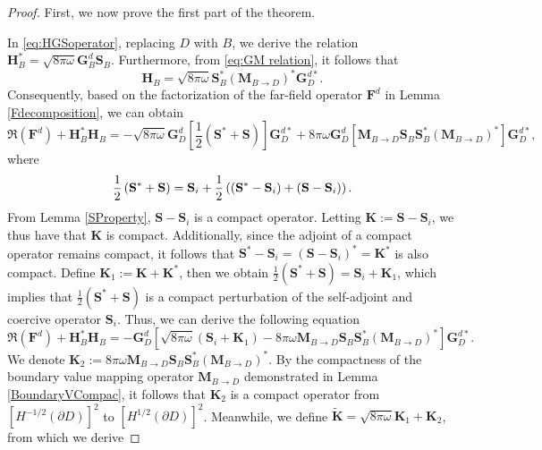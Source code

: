 \documentclass[11pt,reqno,twoside]{amsart}
\theoremstyle{definition}
\theoremstyle{remark}
\numberwithin{equation}{section}
\begin{document}
\begin{proof}
First, we now prove the first part of the theorem.

In  \eqref{eq:HGSoperator}, replacing \( D \) with \( B \), we derive the relation $\mathbf H^*_B=\sqrt{8\pi\omega}\mathbf G^d_B \mathbf S_B$. Furthermore, from \eqref{eq:GM relation}, it follows that 
\begin{equation}\label{eq:Decomposition H}
    \mathbf H_B= \sqrt{8\pi\omega}\mathbf S^*_B \left( \mathbf M_{B \to D} \right) ^* \mathbf G_D^{d*}.
\end{equation}
Consequently, based on the factorization of the far-field operator $\mathbf F^d$ in Lemma \ref{Fdecomposition}, we can obtain
$$
\Re\left( \mathbf F^d\right)+\mathbf H^*_B\mathbf H_B = -\sqrt{8\pi\omega}\mathbf G_D^d \left[ \frac{1}{2}\left( \mathbf S^*+\mathbf S\right) \right] \mathbf G_D^{d*}+ 8\pi\omega\mathbf G_D^d \left[\mathbf M_{B \to D}\mathbf S_B\mathbf S^*_B\left( \mathbf M_{B \to D}\right) ^*\right] \mathbf G_D^{d*},
$$
where
\begin{equation}\notag\begin{aligned}
\frac{1}{2}\left( \mathbf S^*+\mathbf S\right) 
= \mathbf S_{i} + \frac{1}{2}\left( \left( \mathbf S^*-\mathbf S_{i}\right) +\left( \mathbf S-\mathbf S_{i}\right) \right) .
\end{aligned}\end{equation}
From Lemma \ref{SProperty}, $\mathbf S-\mathbf S_i$ is a compact operator. Letting $\mathbf K:= \mathbf S-\mathbf S_{i}$, we thus have that $\mathbf K$ is compact. Additionally, since the adjoint of a compact operator remains compact, it follows that $\mathbf S^*-\mathbf S_{i}=\left(\mathbf S-\mathbf S_{i}\right) ^*=\mathbf K^*$ is also compact. Define $\mathbf K_1:=\mathbf K +\mathbf K^*$, then we obtain $\frac{1}{2}\left( \mathbf S^*+\mathbf S\right)=\mathbf S_{i} +\mathbf K_1$, which implies that $\frac{1}{2}\left( \mathbf S^*+\mathbf S\right)$ is a compact perturbation of the self-adjoint and coercive operator $\mathbf S_{i}$. Thus, we can derive the following equation
$$
\Re\left( \mathbf F^d\right)+\mathbf H^*_B\mathbf H_B = -\mathbf G_D^d \left[\sqrt{8\pi\omega}\left( \mathbf S_{i} +\mathbf K_1 \right)-8\pi\omega \mathbf M_{B \to D}\mathbf S_B\mathbf S^*_B\left( \mathbf M_{B \to D}\right) ^*\right]\mathbf G_D^{d*}.
$$
We denote $\mathbf K_2:=8\pi\omega \mathbf M_{B \to D}\mathbf S_B\mathbf S^*_B\left( \mathbf M_{B \to D}\right) ^*$. By the compactness of the boundary value mapping operator $\mathbf M_{B \to D}$ demonstrated in Lemma \ref{BoundaryVCompac}, it follows that $\mathbf K_2$ is a compact operator from $ \left[H^{-1/2}\left(\partial D \right) \right]^2 $ to $\left[H^{1/2}\left(\partial D \right) \right]^2$. Meanwhile, we define $\mathbf{\tilde{K}}=\sqrt{8\pi\omega} \mathbf K_1+\mathbf K_2$, from which we derive 

\end{proof}
\end{document}
